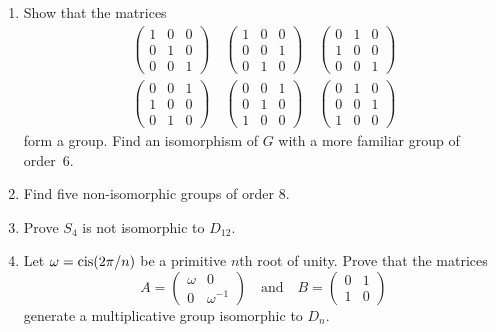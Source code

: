 {\begin{enumerate}
\item
Show that the matrices
\begin{gather*}
\begin{pmatrix}
1 & 0 & 0 \\
0 & 1 & 0 \\
0 & 0 & 1
\end{pmatrix}
\quad
\begin{pmatrix}
1 & 0 & 0 \\
0 & 0 & 1 \\
0 & 1 & 0
\end{pmatrix}
\quad
\begin{pmatrix}
0 & 1 & 0 \\
1 & 0 & 0 \\
0 & 0 & 1
\end{pmatrix} \\
\begin{pmatrix}
0 & 0 & 1 \\
1 & 0 & 0 \\
0 & 1 & 0
\end{pmatrix}
\quad
\begin{pmatrix}
0 & 0 & 1 \\
0 & 1 & 0 \\
1 & 0 & 0
\end{pmatrix}
\quad
\begin{pmatrix}
0 & 1 & 0 \\
0 & 0 & 1 \\
1 & 0 & 0
\end{pmatrix}
\end{gather*}
form a group. Find an isomorphism of $G$ with a more familiar group of
order~6. 

 
\item
Find five non-isomorphic groups of order 8.
 

\item
Prove $S_4$ is not isomorphic to $D_{12}$.
 

\item
Let $\omega = \operatorname{cis}(2 \pi /n)$ be a primitive $n$th root of
unity.  Prove that the matrices 
\[
A=
\begin{pmatrix}
\omega & 0 \\
0 & \omega^{-1}
\end{pmatrix}
\quad \text{and} \quad
B =
\begin{pmatrix}
0 & 1 \\
1 & 0
\end{pmatrix}
\]
generate a multiplicative group isomorphic to $D_n$.
 


\end{enumerate}}
